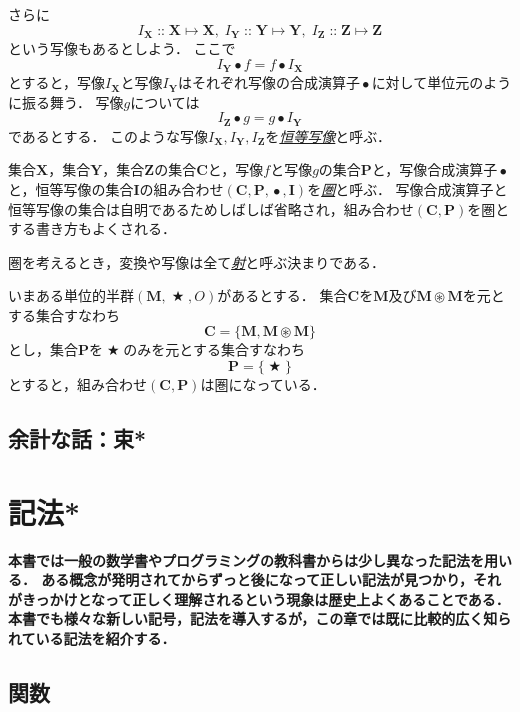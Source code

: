 \documentclass[twocolumn]{jsbook}
\newcommand{\keyword}[1]{\underline{\emph{#1}}}
\newenvironment{leader}{\begingroup\bf}{\endgroup}
\DeclareMathOperator{\mathAnyBinaryOperator}{\bigstar}
\DeclareMathOperator{\mathCompose}{\bullet}
\DeclareMathOperator{\mathIn}{::}
\DeclareMathOperator{\mathMapsTo}{\mapsto}
\DeclareMathOperator{\mathSetTimes}{\circledast}
\newcommand{\mathSet}[1]{\mathbf{#1}}
\newcommand{\mathCategoryShort}[2]{(#1,#2)}
\newcommand{\mathMorph}[2]{#1\mathMapsTo#2}
\newcommand{\mathMonoid}[3]{(#1,#2,#3)}
\newcommand{\mathCategory}[4]{(#1,#2,#3,#4)}
\begin{document}
さらに$$I_\mathSet{X}\mathIn\mathMorph{\mathSet{X}}{\mathSet{X}},\;I_\mathSet{Y}\mathIn\mathMorph{\mathSet{Y}}{\mathSet{Y}},\;I_\mathSet{Z}\mathIn\mathMorph{\mathSet{Z}}{\mathSet{Z}}$$という写像もあるとしよう．
ここで$$I_\mathSet{Y}\mathCompose f=f\mathCompose I_\mathSet{X}$$とすると，写像$I_\mathSet{X}$と写像$I_\mathSet{Y}$はそれぞれ写像の合成演算子$\mathCompose$に対して単位元のように振る舞う．
写像$g$については$$I_\mathSet{Z}\mathCompose g=g\mathCompose I_\mathSet{Y}$$であるとする．
このような写像$I_\mathSet{X},I_\mathSet{Y},I_\mathSet{Z}$を\keyword{恒等写像}と呼ぶ．

集合$\mathSet{X}$，集合$\mathSet{Y}$，集合$\mathSet{Z}$の集合$\mathSet{C}$と，写像$f$と写像$g$の集合$\mathSet{P}$と，写像合成演算子$\mathCompose$と，恒等写像の集合$\mathSet{I}$の組み合わせ$\mathCategory{\mathSet{C}}{\mathSet{P}}{\mathCompose}{\mathSet{I}}$を\keyword{圏}と呼ぶ．
写像合成演算子と恒等写像の集合は自明であるためしばしば省略され，組み合わせ$\mathCategoryShort{\mathSet{C}}{\mathSet{P}}$を圏とする書き方もよくされる．

圏を考えるとき，変換や写像は全て\keyword{射}と呼ぶ決まりである．

いまある単位的半群$\mathMonoid{\mathSet{M}}{\mathAnyBinaryOperator}{O}$があるとする．
集合$\mathSet{C}$を$\mathSet{M}$及び$\mathSet{M}\mathSetTimes\mathSet{M}$を元とする集合すなわち$$\mathSet{C}=\{\mathSet{M},\mathSet{M}\mathSetTimes\mathSet{M}\}$$とし，集合$\mathSet{P}$を$\mathAnyBinaryOperator$のみを元とする集合すなわち$$\mathSet{P}=\{\mathAnyBinaryOperator\}$$とすると，組み合わせ$\mathCategoryShort{\mathSet{C}}{\mathSet{P}}$は圏になっている．

\section*{余計な話：束*}


\chapter{記法*}

\begin{leader}
本書では一般の数学書やプログラミングの教科書からは少し異なった記法を用いる．
ある概念が発明されてからずっと後になって正しい記法が見つかり，それがきっかけとなって正しく理解されるという現象は歴史上よくあることである．
本書でも様々な新しい記号，記法を導入するが，この章では既に比較的広く知られている記法を紹介する．
\end{leader}


\section{関数}
\end{document}
